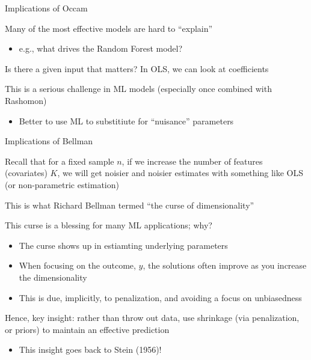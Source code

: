 \documentclass[notes,11pt, aspectratio=169]{beamer}
\newenvironment{wideitemize}{\itemize\addtolength{\itemsep}{10pt}}{\enditemize}
\begin{document}
\begin{frame}{Implications of Occam}
  \begin{wideitemize}
  \item Many of the most effective models are hard to ``explain''
    \begin{itemize}
    \item e.g., what drives the Random Forest model?
    \end{itemize}
  \item Is there a given input that matters? In OLS, we can look at coefficients
  \item This is a serious challenge in ML models (especially once
    combined with Rashomon)
    \begin{itemize}
    \item Better to use ML to substitiute for ``nuisance'' parameters
    \end{itemize}
  \end{wideitemize}
\end{frame}


\begin{frame}{Implications of Bellman}
  \begin{wideitemize}
  \item Recall that for a fixed sample $n$, if we increase the number
    of features (covariates) $K$, we will get noisier and noisier
    estimates with something like OLS (or non-parametric estimation)
  \item This is what Richard Bellman termed ``the curse of dimensionality''
  \item This curse is a blessing for many ML applications; why?
    \begin{itemize}
    \item The curse shows up in estiamting underlying parameters
    \item When focusing on the outcome, $y$, the solutions often
      improve as you increase the dimensionality
    \item This is due, implicitly, to penalization, and avoiding a
      focus on unbiasedness
    \end{itemize}
  \item Hence, key insight: rather than throw out data, use shrinkage
    (via penalization, or priors) to maintain an effective prediction
    \begin{itemize}
    \item This insight goes back to Stein (1956)!
    \end{itemize}
  \end{wideitemize}
\end{frame}
\end{document}
